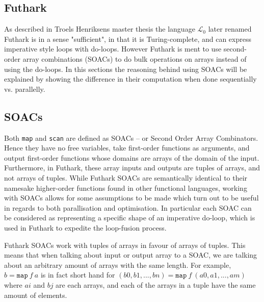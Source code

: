 \documentclass[11pt]{article}
\begin{document}
\subsection{Futhark}
As described in Troels Henriksens master thesis \cite[The $\mathcal{L}_0$ language, p. 8]{MasterTroels} the language $\mathcal{L}_0$ later renamed Futhark is in a sense "sufficient", in that it is Turing-complete, and can express imperative style loops with do-loops. However Futhark is ment to use second-order array combinations (SOACs) to do bulk operations on arrays instead of using the do-loops. In this sections the reasoning behind using SOACs will be explained by showing the difference in their computation when done sequentially vs. parallelly.
\subsection{SOACs}
Both \texttt{map} and \texttt{scan} are defined as SOACs -- or Second Order Array Combinators. Hence they have no free variables, take first-order functions as arguments, and output first-order
 functions whose domains are arrays of the domain of the input. Furthermore, in Futhark, these array inputs and outputs are tuples of arrays, and not arrays of tuples.
While Futhark SOACs are semantically identical to their namesake higher-order functions found in other functional languages, working with SOACs allows for some assumptions to be made
 which turn out to be useful in regards to both parallisation and optimisation. In particular each SOAC can be considered as representing a specific shape of an imperative do-loop, which
 is used in Futhark to expedite the loop-fusion process. \cite[chap. 7]{MasterTroels}

Futhark SOACs work with tuples of arrays in favour of arrays of tuples. This means that when talking about input or output array to a SOAC, we are talking about an arbitrary amount of arrays with
 the same length. For example, $b = \mathtt{map} \: f \: a$ is in fact short hand for $(b0, b1,..., bn) = \mathtt{map} \: f \: (a0, a1, ..., am)$ where $ai$ and $bj$ are each arrays, and each of the arrays
 in a tuple have the same amount of
 elements.
\end{document}
